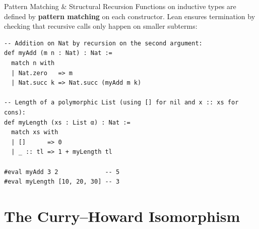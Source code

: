 \documentclass[aspectratio=169, 10pt]{beamer}
\begin{document}
\begin{frame}[fragile]{Pattern Matching \& Structural Recursion}
  Functions on inductive types are defined by \textbf{pattern matching} on each constructor. Lean ensures termination by checking that recursive calls only happen on smaller subterms:

  \vspace{0.15cm}
\begin{lstlisting}[language=Lean4]
-- Addition on Nat by recursion on the second argument:
def myAdd (m n : Nat) : Nat :=
  match n with
  | Nat.zero   => m
  | Nat.succ k => Nat.succ (myAdd m k)

-- Length of a polymorphic List (using [] for nil and x :: xs for cons):
def myLength (xs : List α) : Nat :=
  match xs with
  | []      => 0
  | _ :: tl => 1 + myLength tl

#eval myAdd 3 2             -- 5
#eval myLength [10, 20, 30] -- 3
\end{lstlisting}
\end{frame}

\section{The Curry--Howard Isomorphism}
\end{document}
